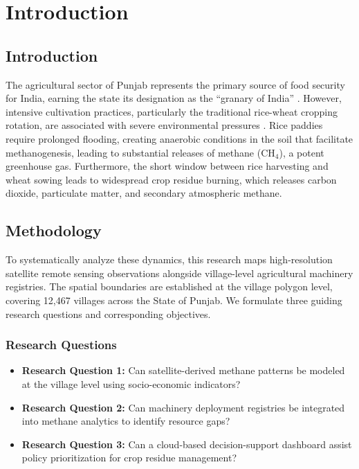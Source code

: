 \documentclass[12pt,a4paper]{report}
\begin{document}
\tableofcontents
\listoffigures
\listoftables

\clearpage
{}

\chapter{Introduction}
\label{ch:intro}

\section{Introduction}
The agricultural sector of Punjab represents the primary source of food security for India, earning the state its designation as the ``granary of India'' \citep{singh2020paddy}. However, intensive cultivation practices, particularly the traditional rice-wheat cropping rotation, are associated with severe environmental pressures \citep{banger2021agricultural}. Rice paddies require prolonged flooding, creating anaerobic conditions in the soil that facilitate methanogenesis, leading to substantial releases of methane ($\text{CH}_4$), a potent greenhouse gas. Furthermore, the short window between rice harvesting and wheat sowing leads to widespread crop residue burning, which releases carbon dioxide, particulate matter, and secondary atmospheric methane.

\section{Methodology}
To systematically analyze these dynamics, this research maps high-resolution satellite remote sensing observations alongside village-level agricultural machinery registries. The spatial boundaries are established at the village polygon level, covering 12,467 villages across the State of Punjab. We formulate three guiding research questions and corresponding objectives.

\subsection{Research Questions}
\begin{itemize}
    \item \textbf{Research Question 1:} Can satellite-derived methane patterns be modeled at the village level using socio-economic indicators?
    \item \textbf{Research Question 2:} Can machinery deployment registries be integrated into methane analytics to identify resource gaps?
    \item \textbf{Research Question 3:} Can a cloud-based decision-support dashboard assist policy prioritization for crop residue management?
\end{itemize}
\end{document}
